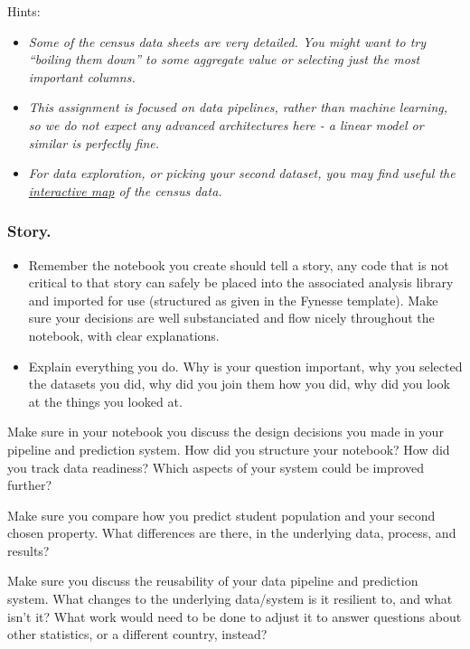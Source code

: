 \documentclass[11pt]{article}
\begin{document}
Hints:

\begin{itemize}
\item
  \emph{Some of the census data sheets are very detailed. You might want
  to try ``boiling them down'' to some aggregate value or selecting just
  the most important columns.}
\item
  \emph{This assignment is focused on data pipelines, rather than
  machine learning, so we do not expect any advanced architectures here
  - a linear model or similar is perfectly fine.}
\item
  \emph{For data exploration, or picking your second dataset, you may
  find useful the \href{https://www.ons.gov.uk/census/maps/}{interactive
  map} of the census data.}
\end{itemize}

    \subsubsection{Story.}\label{story.}

\begin{itemize}
\item
  Remember the notebook you create should tell a story, any code that is
  not critical to that story can safely be placed into the associated
  analysis library and imported for use (structured as given in the
  Fynesse template). Make sure your decisions are well substanciated and
  flow nicely throughout the notebook, with clear explanations.
\item
  Explain everything you do. Why is your question important, why you
  selected the datasets you did, why did you join them how you did, why
  did you look at the things you looked at.
\end{itemize}

Make sure in your notebook you discuss the design decisions you made in
your pipeline and prediction system. How did you structure your
notebook? How did you track data readiness? Which aspects of your system
could be improved further?

Make sure you compare how you predict student population and your second
chosen property. What differences are there, in the underlying data,
process, and results?

Make sure you discuss the reusability of your data pipeline and
prediction system. What changes to the underlying data/system is it
resilient to, and what isn't it? What work would need to be done to
adjust it to answer questions about other statistics, or a different
country, instead?
\end{document}
